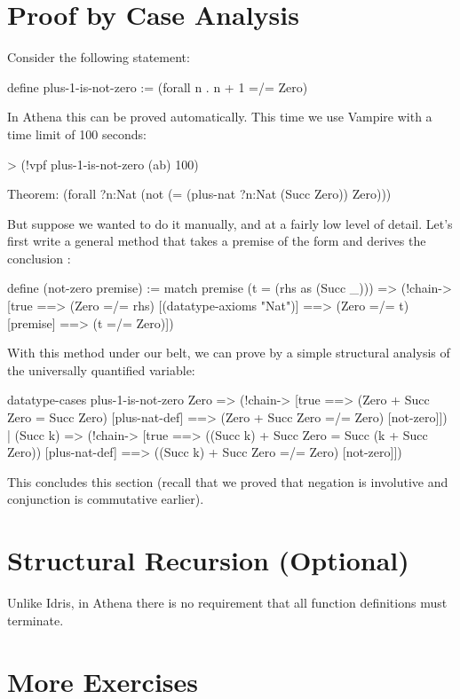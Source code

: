 \section{Proof by Case Analysis}
Consider the following statement: 
\begin{tcAthena}
define plus-1-is-not-zero := (forall n . n + 1 =/= Zero)
\end{tcAthena}
In Athena this can be proved automatically. This time we use Vampire with a time limit of 100 seconds:
\begin{tcAthena}
> (!vpf plus-1-is-not-zero (ab) 100)

Theorem: (forall ?n:Nat
           (not (= (plus-nat ?n:Nat
                             (Succ Zero))
                   Zero)))
\end{tcAthena}
But suppose we wanted to do it manually, and at a fairly low level of detail.
Let's first write a general method that takes a premise of the form 
 and derives the conclusion : 
\begin{tcAthena}
define (not-zero premise) := 
  match premise {
    (t = (rhs as (Succ _))) => 
      (!chain-> [true ==> (Zero =/= rhs)   [(datatype-axioms "Nat")]
                      ==> (Zero =/= t)     [premise]
                      ==> (t =/= Zero)])
  }
\end{tcAthena}
With this method under our belt, we can prove  
by a simple structural analysis of the universally quantified variable: 
\begin{tcAthena}
datatype-cases plus-1-is-not-zero {
  Zero => (!chain-> [true 
                 ==> (Zero + Succ Zero = Succ Zero)          [plus-nat-def]
                 ==> (Zero + Succ Zero =/= Zero)             [not-zero]])
| (Succ k) => 
    (!chain-> [true 
           ==> ((Succ k) + Succ Zero = Succ (k + Succ Zero)) [plus-nat-def]
           ==> ((Succ k) + Succ Zero =/= Zero)               [not-zero]])
}
\end{tcAthena}
This concludes this section (recall that we proved that negation is involutive and conjunction
is commutative earlier). 

\section{Structural Recursion (Optional)}

Unlike Idris, in Athena there is no requirement that all function definitions must terminate. 

\section{More Exercises}

